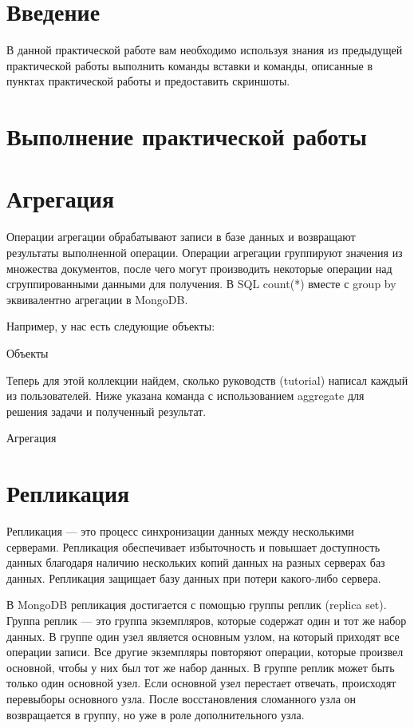 \section*{\LARGE Введение}

В данной практической работе вам необходимо используя знания из
предыдущей практической работы выполнить команды вставки и команды,
описанные в пунктах практической работы и предоставить скриншоты.

\clearpage

\section*{\LARGE Выполнение практической работы}

\section{Агрегация}

Операции агрегации обрабатывают записи в базе данных и возвращают
результаты выполненной операции. Операции агрегации группируют значения
из множества документов, после чего могут производить некоторые операции
над сгруппированными данными для получения. В SQL count(*) вместе с group
by эквивалентно агрегации в MongoDB.

Например, у нас есть следующие объекты:
\begin{image}
	\caption{Объекты}
	\label{fig:object}
\end{image}

Теперь для этой коллекции найдем, сколько руководств (tutorial) написал
каждый из пользователей. Ниже указана команда с использованием aggregate
для решения задачи и полученный результат.
\begin{image}
	\caption{Агрегация}
	\label{fig:aggregate}
\end{image}


\section{Репликация}

Репликация --- это процесс синхронизации данных между несколькими
серверами. Репликация обеспечивает избыточность и повышает доступность
данных благодаря наличию нескольких копий данных на разных серверах баз
данных. Репликация защищает базу данных при потери какого-либо сервера.\par
В MongoDB репликация достигается с помощью группы реплик (replica
set). Группа реплик --- это группа экземпляров, которые содержат один и тот же
набор данных. В группе один узел является основным узлом, на который
приходят все операции записи. Все другие экземпляры повторяют операции,
которые произвел основной, чтобы у них был тот же набор данных. В группе
реплик может быть только один основной узел. Если основной узел перестает
отвечать, происходят перевыборы основного узла. После восстановления
сломанного узла он возвращается в группу, но уже в роле дополнительного
узла.

